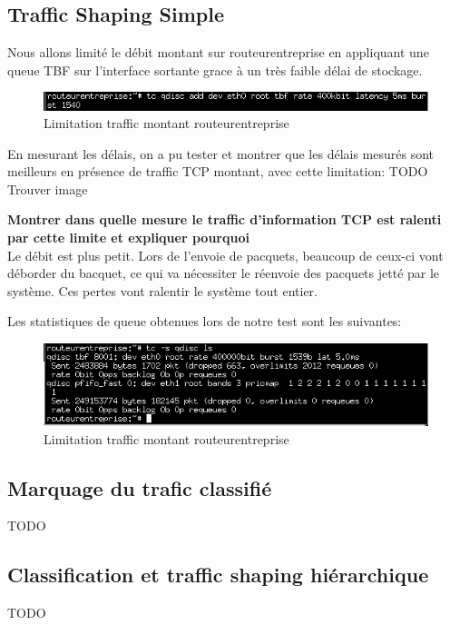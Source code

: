 \documentclass{article}
\begin{document}
\subsection{Traffic Shaping Simple}
Nous allons limité le débit montant sur routeurentreprise en appliquant une queue TBF sur l'interface sortante grace à un très faible délai de stockage.
\begin{figure}[h]
  \centering
  \includegraphics[width=\linewidth]{./captures/11-limite.png}
  \caption{Limitation traffic montant routeurentreprise}
  \label{fig:token-bucket}
\end{figure}

En mesurant les délais, on a pu tester et montrer que les délais mesurés sont meilleurs en présence de traffic TCP montant, avec cette limitation:
TODO Trouver image

\textbf{Montrer dans quelle mesure le traffic d'information TCP est ralenti par cette limite et expliquer pourquoi}\\
Le débit est plus petit. Lors de l'envoie de pacquets, beaucoup de ceux-ci vont déborder du bacquet, ce qui va nécessiter le réenvoie des pacquets jetté par le système. Ces pertes vont ralentir le système tout entier.

Les statistiques de queue obtenues lors de notre test sont les suivantes:
\begin{figure}[h]
  \centering
  \includegraphics[width=\linewidth]{./captures/13-stat-queue.png}
  \caption{Limitation traffic montant routeurentreprise}
  \label{fig:token-bucket}
\end{figure}

\subsection{Marquage du trafic classifié}
TODO

\subsection{Classification et traffic shaping hiérarchique}
TODO
\end{document}
